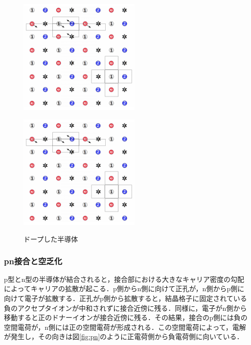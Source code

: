 \begin{figure}[h]
  \centering
  \begin{minipage}[b]{0.4\linewidth}
    \includegraphics[width=6cm]{./figure/HitOR.png}
    \label{fig:Donner}
  \end{minipage}
  \begin{minipage}[b]{0.4\linewidth}
    \includegraphics[width=6cm]{./figure/HitOR.png}
    \label{fig:Acceptor}
  \end{minipage}
  \caption{ドープした半導体}
\end{figure}


\subsubsection*{pn接合と空乏化}
p型とn型の半導体が結合されると，接合部における大きなキャリア密度の勾配によってキャリアの拡散が起こる．p側からn側に向けて正孔が，n側からp側に向けて電子が拡散する．正孔がp側から拡散すると，結晶格子に固定されている負のアクセプタイオンが中和されずに接合近傍に残る．同様に，電子がn側から移動すると正のドナーイオンが接合近傍に残る．その結果，接合のp側には負の空間電荷が，n側には正の空間電荷が形成される．この空間電荷によって，電解が発生し，その向きは図\ref{fig:pn}のように正電荷側から負電荷側に向いている．\par

